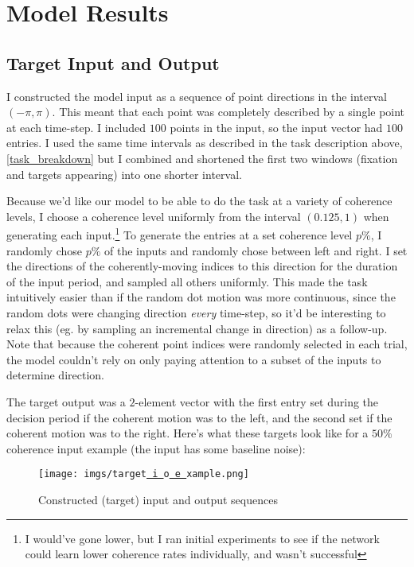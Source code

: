 \documentclass[11pt]{article}
\renewcommand{\_}[1]{\underline{ #1 }}
\theoremstyle{definition}
\begin{document}
\section{Model Results}

\subsection{Target Input and Output}

I constructed the model input as a sequence of point directions in the interval $(-\pi, \pi)$. This meant that each point was completely described by a single point at each time-step. I included $100$ points in the input, so the input vector had $100$ entries. I used the same time intervals as described in the task description above,\ref{task_breakdown} but I combined and shortened the first two windows (fixation and targets appearing) into one shorter interval.

Because we'd like our model to be able to do the task at a variety of coherence levels, I choose a coherence level uniformly from the interval $(0.125, 1)$ when generating each input.\footnote{I would've gone lower, but I ran initial experiments to see if the network could learn lower coherence rates individually, and wasn't successful} To generate the entries at a set coherence level $p\%$, I randomly chose $p\%$ of the inputs and randomly chose between left and right. I set the directions of the coherently-moving indices to this direction for the duration of the input period, and sampled all others uniformly. This made the task intuitively easier than if the random dot motion was more continuous, since the random dots were changing direction \emph{every} time-step, so it'd be interesting to relax this (eg. by sampling an incremental change in direction) as a follow-up. Note that because the coherent point indices were randomly selected in each trial, the model couldn't rely on only paying attention to a subset of the inputs to determine direction.

The target output was a $2$-element vector with the first entry set during the decision period if the coherent motion was to the left, and the second set if the coherent motion was to the right. Here's what these targets look like for a $50\%$ coherence input example (the input has some baseline noise):

\begin{figure}[H]
  \centering
  \texttt{[image: imgs/target\_io\_example.png]}
  \caption{Constructed (target) input and output sequences}
\end{figure}
\end{document}
